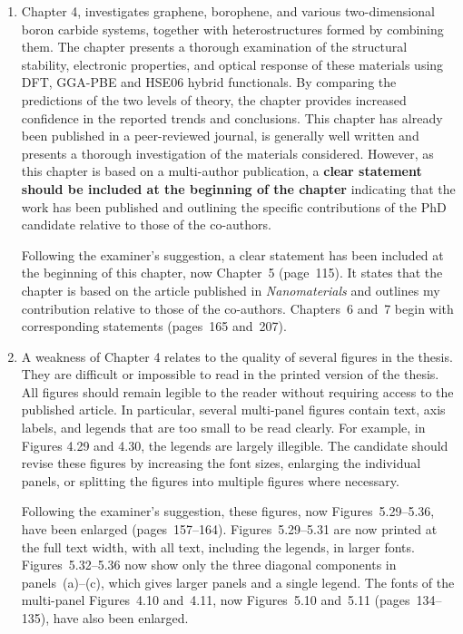 \documentclass[12pt,a4paper]{article}
\newenvironment{reply}{\par\medskip\color{replyblue}}{\par\medskip}
\begin{document}
\begin{enumerate}[leftmargin=*]
\begin{reply}
The optical properties of $\alpha$-beryllene and $\beta$-beryllene are from my own calculations, presented in Chapter~7.
This is now made clear in the captions of Figures~3.1--3.6 (pages~82--96).
\end{reply}

\item Chapter 4, investigates graphene, borophene, and various two-dimensional boron carbide systems, together with heterostructures formed by combining them. The chapter presents a thorough examination of the structural stability, electronic properties, and optical response of these materials using DFT, GGA-PBE and HSE06 hybrid functionals. By comparing the predictions of the two levels of theory, the chapter provides increased confidence in the reported trends and conclusions. This chapter has already been published in a peer-reviewed journal, is generally well written and presents a thorough investigation of the materials considered. However, as this chapter is based on a multi-author publication, a \textbf{clear statement should be included at the beginning of the chapter} indicating that the work has been published and outlining the specific contributions of the PhD candidate relative to those of the co-authors.

\begin{reply}
Following the examiner's suggestion, a clear statement has been included at the beginning of this chapter, now Chapter~5 (page~115).
It states that the chapter is based on the article published in \textit{Nanomaterials} and outlines my contribution relative to those of the co-authors.
Chapters~6 and~7 begin with corresponding statements (pages~165 and~207).
\end{reply}

\item A weakness of Chapter 4 relates to the quality of several figures in the thesis. They are difficult or impossible to read in the printed version of the thesis. All figures should remain legible to the reader without requiring access to the published article. In particular, several multi-panel figures contain text, axis labels, and legends that are too small to be read clearly. For example, in Figures 4.29 and 4.30, the legends are largely illegible. The candidate should revise these figures by increasing the font sizes, enlarging the individual panels, or splitting the figures into multiple figures where necessary.

\begin{reply}
Following the examiner's suggestion, these figures, now Figures~5.29--5.36, have been enlarged (pages~157--164).
Figures~5.29--5.31 are now printed at the full text width, with all text, including the legends, in larger fonts.
Figures~5.32--5.36 now show only the three diagonal components in panels~(a)--(c), which gives larger panels and a single legend.
The fonts of the multi-panel Figures~4.10 and~4.11, now Figures~5.10 and~5.11 (pages~134--135), have also been enlarged.
\end{reply}


\end{enumerate}
\end{document}

